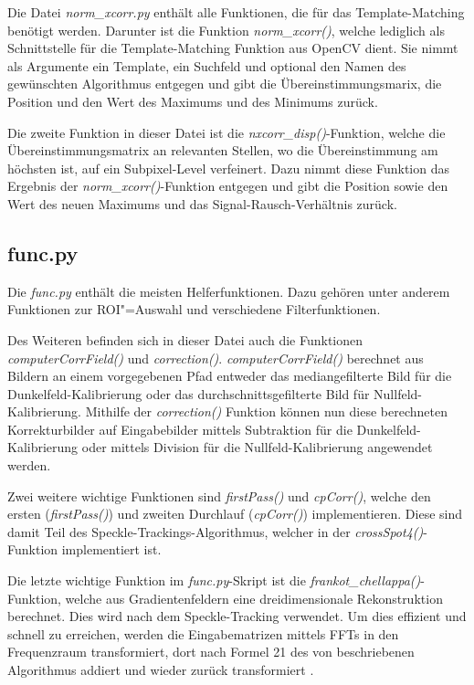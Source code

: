 Die Datei \textit{norm\_xcorr.py} enthält alle Funktionen, die für das Template-Matching benötigt werden. Darunter ist die Funktion \textit{norm\_xcorr()}, welche lediglich als Schnittstelle für die Template-Matching Funktion aus OpenCV dient. Sie nimmt als Argumente ein Template, ein Suchfeld und optional den Namen des gewünschten Algorithmus entgegen und gibt die Übereinstimmungsmarix, die Position und den Wert des Maximums und des Minimums zurück.

Die zweite Funktion in dieser Datei ist die \textit{nxcorr\_disp()}-Funktion, welche die Übereinstimmungsmatrix an relevanten Stellen, wo die Übereinstimmung am höchsten ist, auf ein Subpixel-Level verfeinert. Dazu nimmt diese Funktion das Ergebnis der \textit{norm\_xcorr()}-Funktion entgegen und gibt die Position sowie den Wert des neuen Maximums und das Signal-Rausch-Verhältnis zurück. 

\subsection{func.py}

Die \textit{func.py} enthält die meisten Helferfunktionen. Dazu gehören unter anderem Funktionen zur \gls{ROI}"=Auswahl und verschiedene Filterfunktionen. 

Des Weiteren befinden sich in dieser Datei auch die Funktionen \textit{computerCorrField()} und \textit{correction()}. \textit{computerCorrField()} berechnet aus Bildern an einem vorgegebenen Pfad entweder das mediangefilterte Bild für die Dunkelfeld-Kalibrierung oder das durchschnittsgefilterte Bild für Nullfeld-Kalibrierung. Mithilfe der \textit{correction()} Funktion können nun diese berechneten Korrekturbilder auf Eingabebilder mittels Subtraktion für die Dunkelfeld-Kalibrierung oder mittels Division für die Nullfeld-Kalibrierung angewendet werden.

Zwei weitere wichtige Funktionen sind \textit{firstPass()} und \textit{cpCorr()}, welche den ersten (\textit{firstPass()}) und zweiten Durchlauf (\textit{cpCorr()}) implementieren. Diese sind damit Teil des Speckle-Trackings-Algorithmus, welcher in der \textit{crossSpot4()}-Funktion implementiert ist.

Die letzte wichtige Funktion im \textit{func.py}-Skript ist die \textit{frankot\_chellappa()}-Funktion, welche aus Gradientenfeldern eine dreidimensionale Rekonstruktion berechnet. Dies wird nach dem Speckle-Tracking verwendet. Um dies effizient und schnell zu erreichen, werden die Eingabematrizen mittels \glspl{FFT} in den Frequenzraum transformiert, dort nach Formel 21 des von \citeauthor{FC88} beschriebenen Algorithmus addiert und wieder zurück transformiert . 

